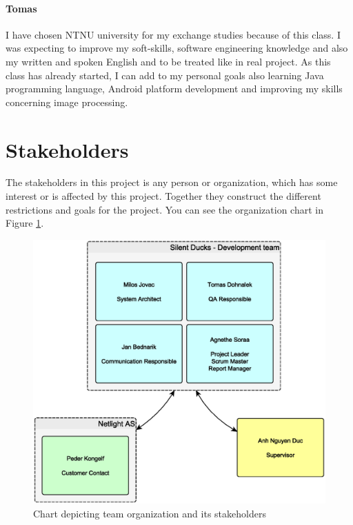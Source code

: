 \paragraph{Tomas}
I have chosen NTNU university for my exchange studies because of this class. 
I was expecting to improve my soft-skills, software engineering knowledge and also my written and spoken English and to be treated like in real project.
As this class has already started, I can add to my personal goals also learning Java programming language,
Android platform development and improving my skills concerning image processing.

\section{Stakeholders}

The stakeholders in this project is any person or organization, which has some interest or is affected by this project. Together they construct the different restrictions and goals for the project. 
You can see the organization chart in Figure \ref{img:organization_chart}.

\begin{figure}[!ht]
    \begin{center}
    \includegraphics[width=12cm]{images/organization_chart.eps}
    \caption[Oganization chart]{Chart depicting team organization and its stakeholders}
    \label{img:organization_chart}
    \end{center}
\end{figure}

